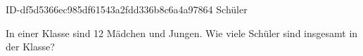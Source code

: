 \begin{exercise}
      {ID-df5d5366ec985df61543a2fdd336b8c6a4a97864}
      {Schüler}
  \ifproblem\problem\par
    In einer Klasse sind 12 Mädchen und  Jungen. Wie viele Schüler sind
    insgesamt in der Klasse?
  \fi
\end{exercise}
